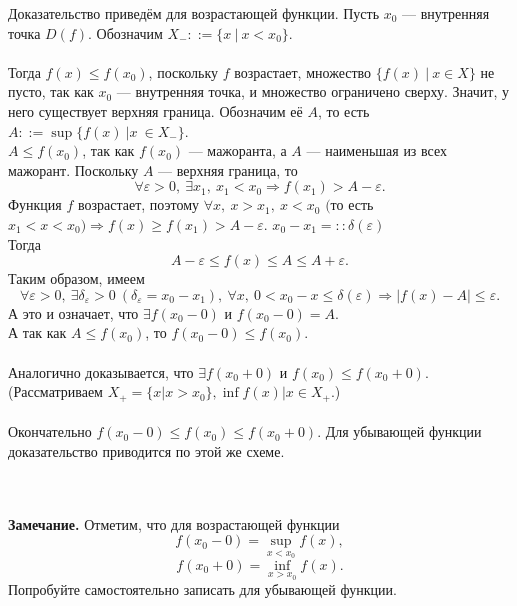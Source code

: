 \begin{Proof}
	Доказательство приведём для возрастающей функции.
	Пусть $x_0$ --- внутренняя точка $D(f)$. Обозначим $X_{-} ::= \{x\ |\ x < x_0\}.$\\\\
	Тогда $f(x) \leqslant f(x_0)$, поскольку $f$ возрастает, множество $\{f(x)\ |\ x \in X\}$ не пусто, так как $x_0$ --- внутренняя точка, и множество ограничено сверху. Значит, у него существует верхняя граница. Обозначим её $A$, то есть $A::= \sup\{f(x)\ |x\ \in X_{-}\}$.\\
	$A \leqslant f(x_0)$, так как $f(x_0)$ --- мажоранта, а $A$ --- наименьшая из всех мажорант. Поскольку $A$ --- верхняя граница, то\\
	$$\forall \varepsilon >0,\ \exists x_1,\ x_1 < x_0 \Rightarrow f(x_1) > A - \varepsilon.$$
	Функция $f$ возрастает, поэтому $\forall x,\ x > x_1,\ x < x_0$
	$($то есть $x_1 < x < x_0) \Rightarrow f(x) \geqslant f(x_1) > A - \varepsilon$. 
	$x_0 - x_1 = ::\delta(\varepsilon)$\\
	Тогда $$A - \varepsilon \leqslant f(x) \leqslant A \leqslant A + \varepsilon.$$ Таким образом, имеем
	$$\forall \varepsilon > 0,\ \exists \delta_{\varepsilon} > 0\ (\delta_{\varepsilon} = x_0 - x_1),\ \forall x,\ 0 < x_0 - x \leqslant \delta(\varepsilon) \Rightarrow |f(x) - A| \leqslant \varepsilon.$$
	А это и означает, что $\exists f(x_0 - 0)$ и $f(x_0-0) = A$.\\
	А так как $A \leqslant f(x_0)$, то $f(x_0-0) \leqslant f(x_0)$.\\\\
	Аналогично доказывается, что $\exists f(x_0 +0)$ и $f(x_0) \leqslant f(x_0+0)$.
	(Рассматриваем $X_{+} = \{x | x > x_0\}, \inf{f(x) | x \in X_{+}}$.)\\\\
	Окончательно $f(x_0-0) \leqslant f (x_0) \leqslant f(x_0+0)$.
	Для убывающей функции доказательство приводится по этой же схеме.
\end{Proof}\\\\
\textbf{Замечание.} Отметим, что для возрастающей функции 
$$f(x_0-0) = \underset{x < x_0}{\sup}f(x),$$ $$f(x_0+0) = \underset{x > x_0}{\inf}f(x).$$
Попробуйте самостоятельно записать для убывающей функции.
